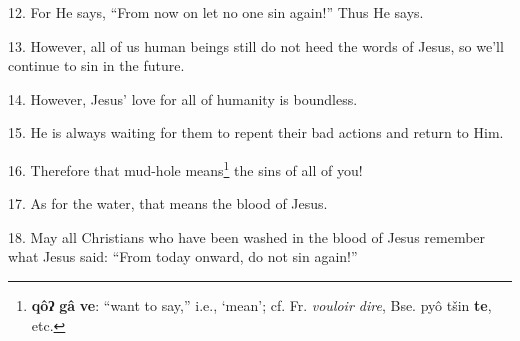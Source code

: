 12. For He says, ``From now on let no one sin again!'' Thus He says.

13. However, all of us human beings still do not heed the words of Jesus, so we'll
continue to sin in the future.

14. However, Jesus' love for all of humanity is boundless.

15. He is always waiting for them to repent their bad actions and return to Him.

16. Therefore that mud-hole means\footnote{\textbf{qôʔ} \textbf{gâ} \textbf{ve}: ``want to say,'' i.e., `mean'; cf. Fr. \textit{vouloir dire}, Bse. pyô tšin \textbf{te}, etc.} the sins of all of you!

17. As for the water, that means the blood of Jesus.

18. May all Christians who have been washed in the blood of Jesus remember what
Jesus said: ``From today onward, do not sin again!''


